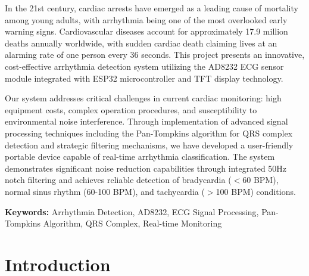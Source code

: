 \documentclass[12pt,a4paper]{article}
\begin{document}
In the 21st century, cardiac arrests have emerged as a leading cause of mortality among young adults, with arrhythmia being one of the most overlooked early warning signs. Cardiovascular diseases account for approximately 17.9 million deaths annually worldwide, with sudden cardiac death claiming lives at an alarming rate of one person every 36 seconds. This project presents an innovative, cost-effective arrhythmia detection system utilizing the AD8232 ECG sensor module integrated with ESP32 microcontroller and TFT display technology.

\vspace{0.5cm}

Our system addresses critical challenges in current cardiac monitoring: high equipment costs, complex operation procedures, and susceptibility to environmental noise interference. Through implementation of advanced signal processing techniques including the Pan-Tompkins algorithm for QRS complex detection and strategic filtering mechanisms, we have developed a user-friendly portable device capable of real-time arrhythmia classification. The system demonstrates significant noise reduction capabilities through integrated 50Hz notch filtering and achieves reliable detection of bradycardia ($<$60 BPM), normal sinus rhythm (60-100 BPM), and tachycardia ($>$100 BPM) conditions.

\vspace{0.5cm}

\textbf{Keywords:} Arrhythmia Detection, AD8232, ECG Signal Processing, Pan-Tompkins Algorithm, QRS Complex, Real-time Monitoring


\section{Introduction}
\end{document}
